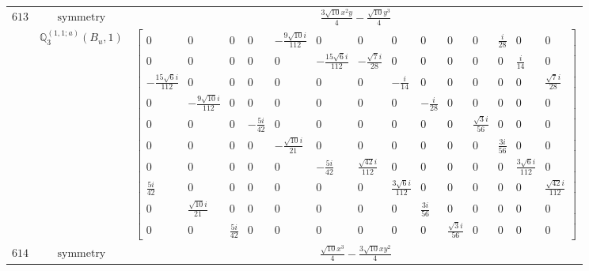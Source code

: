 \documentclass[fleqn,8pt,landscape]{jsarticle}
\begin{document}
\begin{longtable}{ccc}
$ 613 $ & $ \text{symmetry} $ & $ \frac{3 \sqrt{10} x^{2} y}{4} - \frac{\sqrt{10} y^{3}}{4} $ \\
$  $ & $ \mathbb{Q}_{3}^{(1,1;a)}(B_{u},1) $ & $ \begin{bmatrix} 0 & 0 & 0 & 0 & - \frac{9 \sqrt{10} i}{112} & 0 & 0 & 0 & 0 & 0 & 0 & \frac{i}{28} & 0 & 0 \\ 0 & 0 & 0 & 0 & 0 & - \frac{15 \sqrt{6} i}{112} & - \frac{\sqrt{7} i}{28} & 0 & 0 & 0 & 0 & 0 & \frac{i}{14} & 0 \\ - \frac{15 \sqrt{6} i}{112} & 0 & 0 & 0 & 0 & 0 & 0 & - \frac{i}{14} & 0 & 0 & 0 & 0 & 0 & \frac{\sqrt{7} i}{28} \\ 0 & - \frac{9 \sqrt{10} i}{112} & 0 & 0 & 0 & 0 & 0 & 0 & - \frac{i}{28} & 0 & 0 & 0 & 0 & 0 \\ 0 & 0 & 0 & - \frac{5 i}{42} & 0 & 0 & 0 & 0 & 0 & 0 & \frac{\sqrt{3} i}{56} & 0 & 0 & 0 \\ 0 & 0 & 0 & 0 & - \frac{\sqrt{10} i}{21} & 0 & 0 & 0 & 0 & 0 & 0 & \frac{3 i}{56} & 0 & 0 \\ 0 & 0 & 0 & 0 & 0 & - \frac{5 i}{42} & \frac{\sqrt{42} i}{112} & 0 & 0 & 0 & 0 & 0 & \frac{3 \sqrt{6} i}{112} & 0 \\ \frac{5 i}{42} & 0 & 0 & 0 & 0 & 0 & 0 & \frac{3 \sqrt{6} i}{112} & 0 & 0 & 0 & 0 & 0 & \frac{\sqrt{42} i}{112} \\ 0 & \frac{\sqrt{10} i}{21} & 0 & 0 & 0 & 0 & 0 & 0 & \frac{3 i}{56} & 0 & 0 & 0 & 0 & 0 \\ 0 & 0 & \frac{5 i}{42} & 0 & 0 & 0 & 0 & 0 & 0 & \frac{\sqrt{3} i}{56} & 0 & 0 & 0 & 0 \end{bmatrix} $ \\ \hline
$ 614 $ & $ \text{symmetry} $ & $ \frac{\sqrt{10} x^{3}}{4} - \frac{3 \sqrt{10} x y^{2}}{4} $ \\

\end{longtable}
\end{document}
